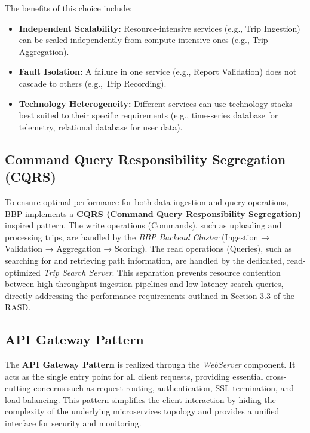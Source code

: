 The benefits of this choice include:
\begin{itemize}
    \item \textbf{Independent Scalability:} Resource-intensive services (e.g., Trip Ingestion) can be scaled independently from compute-intensive ones (e.g., Trip Aggregation).
    \item \textbf{Fault Isolation:} A failure in one service (e.g., Report Validation) does not cascade to others (e.g., Trip Recording).
    \item \textbf{Technology Heterogeneity:} Different services can use technology stacks best suited to their specific requirements (e.g., time-series database for telemetry, relational database for user data).
\end{itemize}

\subsection{Command Query Responsibility Segregation (CQRS)}
To ensure optimal performance for both data ingestion and query operations, BBP implements a \textbf{CQRS (Command Query Responsibility Segregation)}-inspired pattern. The write operations (Commands), such as uploading and processing trips, are handled by the \textit{BBP Backend Cluster} (Ingestion → Validation → Aggregation → Scoring). The read operations (Queries), such as searching for and retrieving path information, are handled by the dedicated, read-optimized \textit{Trip Search Server}. This separation prevents resource contention between high-throughput ingestion pipelines and low-latency search queries, directly addressing the performance requirements outlined in Section 3.3 of the RASD.

\subsection{API Gateway Pattern}
The \textbf{API Gateway Pattern} is realized through the \textit{WebServer} component. It acts as the single entry point for all client requests, providing essential cross-cutting concerns such as request routing, authentication, SSL termination, and load balancing. This pattern simplifies the client interaction by hiding the complexity of the underlying microservices topology and provides a unified interface for security and monitoring.

